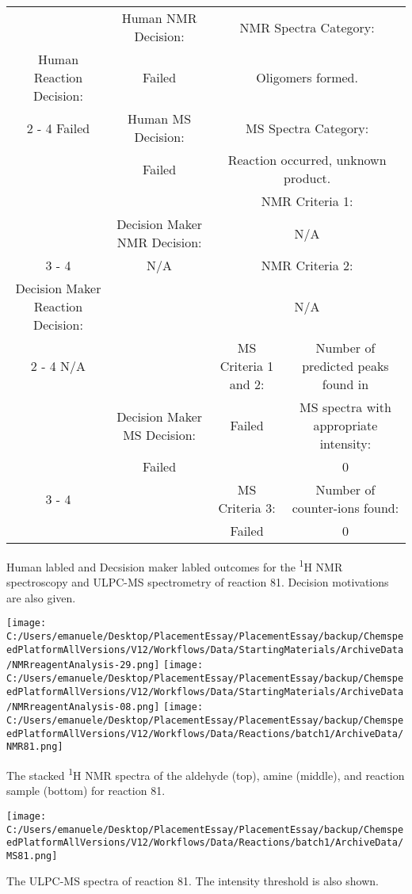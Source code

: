 \documentclass{article}%
\begin{document}
\begin{Decision Table}[H]%
\begin{tabular}{|c|c|c|c|}%
\hline%
&Human NMR Decision:&\multicolumn{2}{|c|}{NMR Spectra Category:}\\%
Human Reaction Decision:&Failed&\multicolumn{2}{|c|}{Oligomers formed.}\\%
\cline{2%
-%
4}%
Failed&Human MS Decision:&\multicolumn{2}{|c|}{MS Spectra Category:}\\%
&Failed&\multicolumn{2}{|c|}{Reaction occurred, unknown product.}\\%
\hline%
&&\multicolumn{2}{|c|}{NMR Criteria 1:}\\%
&Decision Maker NMR Decision:&\multicolumn{2}{|c|}{N/A}\\%
\cline{3%
-%
4}%
&N/A&\multicolumn{2}{|c|}{NMR Criteria 2:}\\%
Decision Maker Reaction Decision:&&\multicolumn{2}{|c|}{N/A}\\%
\cline{2%
-%
4}%
N/A&&MS Criteria 1 and 2:&Number of predicted peaks found in\\%
&Decision Maker MS Decision:&Failed&MS spectra with appropriate intensity:\\%
&Failed&&0\\%
\cline{3%
-%
4}%
&&MS Criteria 3:&Number of counter{-}ions found:\\%
&&Failed&0\\%
\hline%
\end{tabular}%
\caption{Human labled and Decsision maker labled outcomes for the \textsuperscript{1}H NMR spectroscopy and ULPC-MS spectrometry of reaction 81. Decision motivations are also given.}%
\end{Decision Table}%
\begin{NMR Spectra}[H]%
\begin{center}%
\texttt{[image: C:/Users/emanuele/Desktop/PlacementEssay/PlacementEssay/backup/ChemspeedPlatformAllVersions/V12/Workflows/Data/StartingMaterials/ArchiveData/NMRreagentAnalysis-29.png]}\hfill%
\texttt{[image: C:/Users/emanuele/Desktop/PlacementEssay/PlacementEssay/backup/ChemspeedPlatformAllVersions/V12/Workflows/Data/StartingMaterials/ArchiveData/NMRreagentAnalysis-08.png]}\hfill%
\texttt{[image: C:/Users/emanuele/Desktop/PlacementEssay/PlacementEssay/backup/ChemspeedPlatformAllVersions/V12/Workflows/Data/Reactions/batch1/ArchiveData/NMR81.png]}\hfill%
\end{center}%
\caption{The stacked \textsuperscript{1}H NMR spectra of the aldehyde (top), amine (middle), and reaction sample (bottom) for reaction 81.}%
\end{NMR Spectra}%
\begin{MS Spectra}[H]%
\begin{center}%
\texttt{[image: C:/Users/emanuele/Desktop/PlacementEssay/PlacementEssay/backup/ChemspeedPlatformAllVersions/V12/Workflows/Data/Reactions/batch1/ArchiveData/MS81.png]}\hfill%
\end{center}%
\caption{The ULPC-MS spectra of reaction 81. The intensity threshold is also shown.}%
\end{MS Spectra}%
\end{document}

